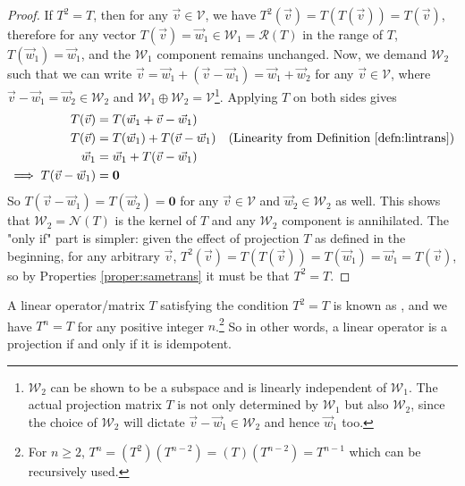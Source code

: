 \begin{proof}
If $T^2 = T$, then for any $\vec{v} \in \mathcal{V}$, we have $T^2(\vec{v}) = T(T(\vec{v})) = T(\vec{v})$, therefore for any vector $T(\vec{v}) = \vec{w}_1 \in \mathcal{W}_1 = \mathcal{R}(T)$ in the range of $T$, $T(\vec{w}_1) = \vec{w}_1$, and the $\mathcal{W}_1$ component remains unchanged. Now, we demand $\mathcal{W}_2$ such that we can write $\vec{v} = \vec{w}_1 + (\vec{v} - \vec{w}_1) = \vec{w}_1 + \vec{w}_2$ for any $\vec{v} \in \mathcal{V}$, where $\vec{v} - \vec{w}_1 = \vec{w}_2 \in \mathcal{W}_2$ and $\mathcal{W}_1 \oplus \mathcal{W}_2 = \mathcal{V}$\footnote{$\mathcal{W}_2$ can be shown to be a subspace and is linearly independent of $\mathcal{W}_1$. The actual projection matrix $T$ is not only determined by $\mathcal{W}_1$ but also $\mathcal{W}_2$, since the choice of $\mathcal{W}_2$ will dictate $\vec{v} - \vec{w}_1 \in \mathcal{W}_2$ and hence $\vec{w}_1$ too.}. Applying $T$ on both sides gives 
\begin{align*}
T(\vec{v}) &= T(\vec{w}_1 + \vec{v} - \vec{w}_1) \\
T(\vec{v}) &= T(\vec{w}_1) + T(\vec{v} - \vec{w}_1) & \text{(Linearity from Definition \ref{defn:lintrans})}\\
\vec{w}_1 &= \vec{w}_1 + T(\vec{v} - \vec{w}_1) \\
\implies T(\vec{v} - \vec{w}_1) &= \textbf{0}
\end{align*}
So $T(\vec{v} - \vec{w}_1) = T(\vec{w}_2) = \textbf{0}$ for any $\vec{v} \in \mathcal{V}$ and $\vec{w}_2 \in \mathcal{W}_2$ as well. This shows that $\mathcal{W}_2 = \mathcal{N}(T)$ is the kernel of $T$ and any $\mathcal{W}_2$ component is annihilated. The "only if" part is simpler: given the effect of projection $T$ as defined in the beginning, for any arbitrary $\vec{v}$, $T^2(\vec{v}) = T(T(\vec{v})) = T(\vec{w}_1) = \vec{w}_1 = T(\vec{v})$, so by Properties \ref{proper:sametrans} it must be that $T^2 = T$.
\end{proof}
A linear operator/matrix $T$ satisfying the condition $T^2 = T$ is known as , and we have $T^n = T$ for any positive integer $n$.\footnote{For $n \geq 2$, $T^n = (T^2) (T^{n-2}) = (T) (T^{n-2}) = T^{n-1}$ which can be recursively used.} So in other words, a linear operator is a projection if and only if it is idempotent.

